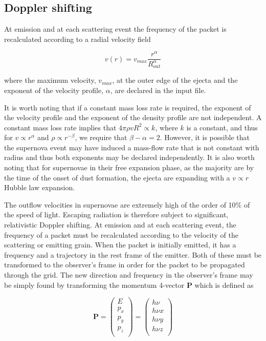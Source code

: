 	\subsection{Doppler shifting}
	
At emission and at each scattering event the frequency of the packet is recalculated according to a radial velocity field 
	
\begin{equation} 
	v(r) = v_{max}\frac{r^{\alpha}}{R_{out}^{\alpha}}
\end{equation}

\noindent where the maximum velocity, $v_{max}$, at the outer edge of the ejecta and the exponent of the velocity profile, $\alpha$, are declared in the input file.	
		
It is worth noting that if a constant mass loss rate is required, the exponent of the velocity profile and the exponent of the density profile are not independent.  A constant mass loss rate implies that $4\pi \rho vR^2  \propto k$, where $k$ is a constant, and thus for $v \propto r^\alpha$ and $\rho\propto r^{-\beta}$, we require that $\beta-\alpha=2$.  However, it is possible that the supernova event may have induced a mass-flow rate that is not constant with radius and thus both exponents may be declared independently.  It is also worth noting that for supernovae in their free expansion phase, as the majority are by the time of the onset of dust formation, the ejecta are expanding with a $v \propto r$ Hubble law expansion.
	
The outflow velocities in supernovae are extremely high of the order of 10\% of the speed of light.  Escaping radiation is therefore subject to significant, relativistic Doppler shifting. At emission and at each scattering event, the frequency of a packet must be recalculated according to the velocity of the scattering or emitting grain.  When the packet is initially emitted, it has a frequency and a trajectory in the rest frame of the emitter. Both of these must be transformed to the observer's frame in order for the packet to be propagated through the grid.  The new direction and frequency in the observer's frame may be simply found by transforming the momentum 4-vector $\boldsymbol{P}$ which is defined as

\begin{equation}
\boldsymbol{P}=
\begin{pmatrix}
	E \\
	p_x \\
	p_y \\
	p_z \\
	\end{pmatrix} =
	\begin{pmatrix}
	h \nu \\
	h \nu x \\
	h \nu y \\
	h \nu z \\
	\end{pmatrix}
\end{equation}


